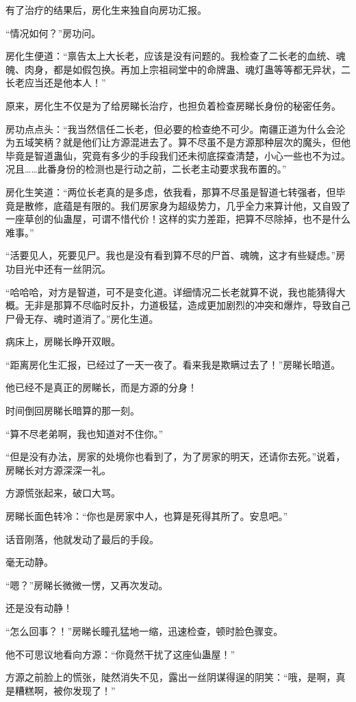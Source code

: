 \begin{this_body}
有了治疗的结果后，房化生来独自向房功汇报。

“情况如何？”房功问。

房化生便道：“禀告太上大长老，应该是没有问题的。我检查了二长老的血统、魂魄、肉身，都是如假包换。再加上宗祖祠堂中的命牌蛊、魂灯蛊等等都无异状，二长老应当还是他本人！”

原来，房化生不仅是为了给房睇长治疗，也担负着检查房睇长身份的秘密任务。

房功点点头：“我当然信任二长老，但必要的检查绝不可少。南疆正道为什么会沦为五域笑柄？就是他们让方源混进去了。算不尽虽不是方源那种层次的魔头，但他毕竟是智道蛊仙，究竟有多少的手段我们还未彻底探查清楚，小心一些也不为过。况且……此番身份的检测也是行动之前，二长老主动要求我布置的。”

房化生笑道：“两位长老真的是多虑，依我看，那算不尽虽是智道七转强者，但毕竟是散修，底蕴是有限的。我们房家身为超级势力，几乎全力来算计他，又自毁了一座草创的仙蛊屋，可谓不惜代价！这样的实力差距，把算不尽除掉，也不是什么难事。”

“活要见人，死要见尸。我也是没有看到算不尽的尸首、魂魄，这才有些疑虑。”房功目光中还有一丝阴沉。

“哈哈哈，对方是智道，可不是变化道。详细情况二长老就算不说，我也能猜得大概。无非是那算不尽临时反扑，力道极猛，造成更加剧烈的冲突和爆炸，导致自己尸骨无存、魂时道消了。”房化生道。

病床上，房睇长睁开双眼。

“距离房化生汇报，已经过了一天一夜了。看来我是欺瞒过去了！”房睇长暗道。

他已经不是真正的房睇长，而是方源的分身！

时间倒回房睇长暗算的那一刻。

“算不尽老弟啊，我也知道对不住你。”

“但是没有办法，房家的处境你也看到了，为了房家的明天，还请你去死。”说着，房睇长对方源深深一礼。

方源慌张起来，破口大骂。

房睇长面色转冷：“你也是房家中人，也算是死得其所了。安息吧。”

话音刚落，他就发动了最后的手段。

毫无动静。

“嗯？”房睇长微微一愣，又再次发动。

还是没有动静！

“怎么回事？！”房睇长瞳孔猛地一缩，迅速检查，顿时脸色骤变。

他不可思议地看向方源：“你竟然干扰了这座仙蛊屋！”

方源之前脸上的慌张，陡然消失不见，露出一丝阴谋得逞的阴笑：“哦，是啊，真是糟糕啊，被你发现了！”


\end{this_body}
